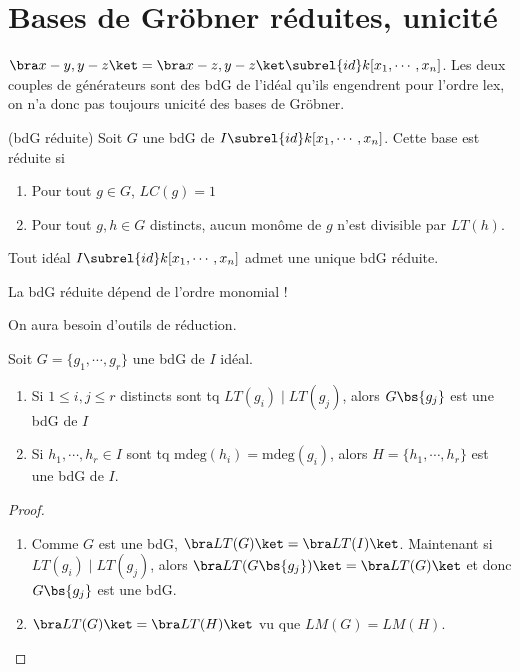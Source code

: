     \section{Bases de Gröbner réduites, unicité}
        \begin{expl}
            $\bra x-y,y-z \ket = \bra x-z, y-z \ket \subrel{id} k[x_1, \cdots, x_n]$. Les deux couples de générateurs sont des bdG de l'idéal qu'ils engendrent pour l'ordre lex, on n'a donc pas toujours unicité des bases de Gröbner.
        \end{expl}
        \begin{defi} (bdG réduite)
            Soit $G$ une bdG de $I \subrel{id} k[x_1, \cdots, x_n]$. Cette base est réduite si
            \begin{enumerate}
                \item Pour tout $g \in G$, $LC(g) = 1$
                \item Pour tout $g,h \in G$ distincts, aucun monôme de $g$ n'est divisible par $LT(h)$.
            \end{enumerate}
        \end{defi}
        \begin{theo}
            \label{1.5.1}
            Tout idéal $I \subrel{id} k[x_1, \cdots, x_n]$ admet une unique bdG réduite.
        \end{theo}
        \begin{remq}
            La bdG réduite dépend de l'ordre monomial !
        \end{remq}
        On aura besoin d'outils de réduction.
        \begin{lemm}
            Soit $G = \{g_1, \cdots, g_r\}$ une bdG de $I$ idéal.
            \begin{enumerate}
                \item Si $1 \leq i,j \leq r$ distincts sont tq $LT(g_i) \mid LT(g_j)$, alors $G \bs \{g_j\}$ est une bdG de $I$
                \item Si $h_1, \cdots, h_r \in I$ sont tq $\mathrm{mdeg}(h_i) = \mathrm{mdeg}(g_i)$, alors $H = \{h_1, \cdots, h_r\}$ est une bdG de $I$.
            \end{enumerate}
        \end{lemm}
        \begin{proof}
            \begin{enumerate}
                \item Comme $G$ est une bdG, $\bra LT(G) \ket = \bra LT(I) \ket$. Maintenant si $LT(g_i) \mid LT(g_j)$, alors $\bra LT(G \bs \{g_j\}) \ket = \bra LT(G) \ket$ et donc $G \bs \{g_j\}$ est une bdG.
                \item $\bra LT(G) \ket = \bra LT(H) \ket$ vu que $LM(G) = LM(H)$.
            \end{enumerate}
        \end{proof}
